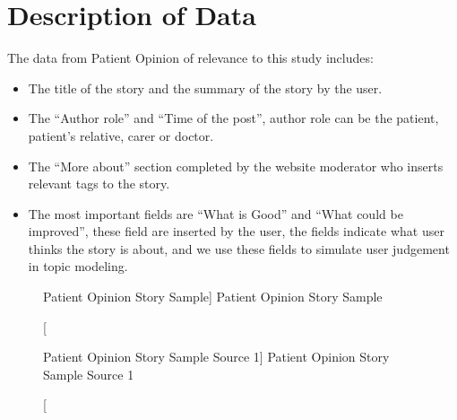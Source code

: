 \documentclass[11pt,twoside]{report}
\begin{document}
\section{Description of Data}
The data from Patient Opinion of relevance to this study includes:
\begin{itemize}
\item The title of the story and the summary of the story by the user.
\item The ``Author role'' and ``Time of the post'', author role can be the patient, patient’s relative, carer or doctor.
\item The ``More about'' section completed by the website moderator who inserts relevant tags to the story.
\item The most important fields are ``What is Good'' and 
``What could be improved'', these field are inserted by the user, the fields indicate what user thinks the story is about, and we use these fields to simulate user judgement in topic modeling.
\end{itemize}

\begin{figure}[h]
    \begin{center}
    \caption
    [Patient Opinion Story Sample]
    {
    Patient Opinion Story Sample
    \label{Figure1}
    }
    \end{center}
\end{figure}

\begin{figure}[h]
    \begin{center}
    \caption
    [Patient Opinion Story Sample Source 1]
    {
    Patient Opinion Story Sample Source 1
    \label{Figure2}
    }
    \end{center}
\end{figure}
\end{document}
